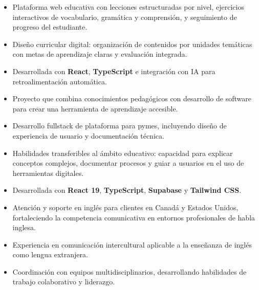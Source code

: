 \documentclass[11pt, a4paper]{awesome-cv}
\begin{document}
\divider

\begin{itemize}
  \item Plataforma web educativa con lecciones estructuradas por nivel, ejercicios interactivos de vocabulario, gramática y comprensión, y seguimiento de progreso del estudiante.
  \item Diseño curricular digital: organización de contenidos por unidades temáticas con metas de aprendizaje claras y evaluación integrada.
  \item Desarrollada con \textbf{React}, \textbf{TypeScript} e integración con IA para retroalimentación automática.
  \item Proyecto que combina conocimientos pedagógicos con desarrollo de software para crear una herramienta de aprendizaje accesible.
\end{itemize}

\divider

\begin{itemize}
  \item Desarrollo fullstack de plataforma para pymes, incluyendo diseño de experiencia de usuario y documentación técnica.
  \item Habilidades transferibles al ámbito educativo: capacidad para explicar conceptos complejos, documentar procesos y guiar a usuarios en el uso de herramientas digitales.
  \item Desarrollada con \textbf{React 19}, \textbf{TypeScript}, \textbf{Supabase} y \textbf{Tailwind CSS}.
\end{itemize}


\begin{itemize}
  \item Atención y soporte en inglés para clientes en Canadá y Estados Unidos, fortaleciendo la competencia comunicativa en entornos profesionales de habla inglesa.
  \item Experiencia en comunicación intercultural aplicable a la enseñanza de inglés como lengua extranjera.
  \item Coordinación con equipos multidisciplinarios, desarrollando habilidades de trabajo colaborativo y liderazgo.
\end{itemize}
\end{document}
